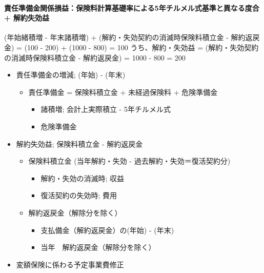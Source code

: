 \documentclass[report,gutter=10mm,fore-edge=10mm,uplatex,dvipdfmx]{jlreq}
\begin{document}
\paragraph{責任準備金関係損益：保険料計算基礎率による5年チルメル式基準と異なる度合
+
解約失効益}

(年始緒積増 - 年末諸積増) + (解約・失効契約の消滅時保険料積立金 -
解約返戻金) = (100 - 200) + (1000 - 800) = 100 うち、解約・失効益 =
(解約・失効契約の消滅時保険料積立金 - 解約返戻金) = 1000 - 800 = 200

\begin{itemize}
\tightlist
\item
  責任準備金の増減; (年始) - (年末)

  \begin{itemize}
  \tightlist
  \item
    責任準備金 = 保険料積立金 + 未経過保険料 + 危険準備金

    \begin{itemize}
    \tightlist
    \item
      諸積増; 会計上実際積立 - 5年チルメル式
    \item
      危険準備金
    \end{itemize}
  \end{itemize}
\item
  解約失効益; 保険料積立金 - 解約返戻金

  \begin{itemize}
  \tightlist
  \item
    保険料積立金 (当年解約・失効 - 過去解約・失効＝復活契約分)

    \begin{itemize}
    \tightlist
    \item
      解約・失効の消滅時; 収益
    \item
      復活契約の失効時; 費用
    \end{itemize}
  \item
    解約返戻金（解除分を除く）

    \begin{itemize}
    \tightlist
    \item
      支払備金（解約返戻金）の(年始) - (年末)
    \item
      当年　解約返戻金（解除分を除く）
    \end{itemize}
  \end{itemize}
\item
  変額保険に係わる予定事業費修正
\end{itemize}
\end{document}
